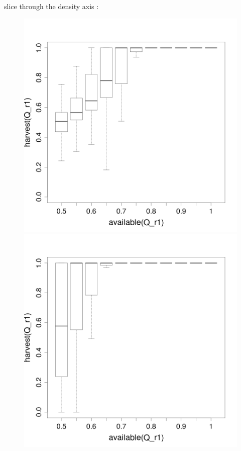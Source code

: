 \documentclass[8pt, handout=show,notes=show]{beamer}
\begin{document}
\begin{frame}{ slice through the density axis : }
\begin{figure}[H]
\includegraphics[width=\imgSize]{images/harvestr1_r1_density-2.png}
\includegraphics[width=\imgSize]{images/harvestr1_r1_density-8.png}\\

\end{figure}
\end{frame}
\end{document}
